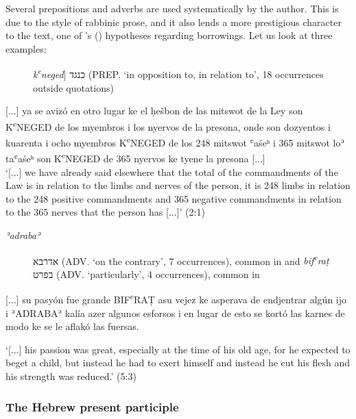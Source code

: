 \documentclass[output=paper,colorlinks,citecolor=brown,babel,arabicfont]{langscibook}
\begin{document}
Several prepositions and adverbs are used systematically by the author. This is due to the style of rabbinic prose, and it also lends a more prestigious character to the text, one of \citeauthor{winford2003}'s (\citeyear[38]{winford2003}) hypotheses regarding borrowings. Let us look at three examples: 

\begin{description}
 \item[]\textit{k\textsuperscript{e}neged}] \texthebrew{כנגד} (PREP. `in opposition to, in relation to', 18 occurrences outside quotations)
\end{description}

\ea\label{ch3.7.ex.n14}
{[...]} ya se avizó en otro lugar ke el ḥešbon de las mitswot de la Ley son K\textsuperscript{e}NEGED de los myembros i los nyervos de la presona, onde son dozyentos i kuarenta i ocho myembros K\textsuperscript{e}NEGED de los 248 mitswot ʿaśeʰ i 365 mitswot loʾ taʿaśeʰ son K\textsuperscript{e}NEGED de 365 nyervos ke tyene la presona {[...]} \\
`{[...]} we have already said elsewhere that the total of the commandments of the Law is in relation to the limbs and nerves of the person, it is 248 limbs in relation to the 248 positive commandments and 365 negative commandments in relation to the 365 nerves that the person has {[...]}' (2:1)
\z

\begin{description}

\item[\textit{ʾadrabaʾ}] \texthebrew{אדרבא} (ADV. `on the contrary', 7 occurrences), common in  and \textit{bif\textsuperscript{e}raṭ} \texthebrew{בפרט} (ADV. `particularly', 4 occurrences), common in 
\end{description}

\ea\label{ch3.7.ex.n15}
{[...]} su pasyón fue grande BIF\textsuperscript{e}RAṬ asu vejez ke asperava de endjentrar algún ijo i ʾADRABAʾ kalía azer algunos esforsos i en lugar de esto se kortó las karnes de modo ke se le aflakó las fuersas.

`{[...]} his passion was great, especially at the time of his old age, for he expected to beget a child, but instead he had to exert himself and instead he cut his flesh and his strength was reduced.' (5:3)
\z

\subsubsection{The Hebrew present participle}\label{ch3.7.ss.3.2.4}
\end{document}
